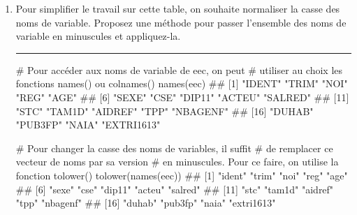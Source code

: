 \documentclass[12pt,twosided, notitlepage]{book}
\newenvironment{Shaded}{}{}
\newcommand{\KeywordTok}[1]{\textcolor[rgb]{0.00,0.00,1.00}{#1}}
\newcommand{\CommentTok}[1]{\textcolor[rgb]{0.00,0.50,0.00}{#1}}
\newcommand{\NormalTok}[1]{#1}
\newif \ifsol
\renewenvironment{Shaded}{\begin{snugshade}}{\end{snugshade}}
\begin{document}
\begin{enumerate}
  \begin{center} \rule{0.5\linewidth}{\linethickness}\end{center}

  \bigskip  \fi 
\item
  Pour simplifier le travail sur cette table, on souhaite normaliser la
  casse des noms de variable. Proposez une méthode pour passer
  l'ensemble des noms de variable en minuscules et
  appliquez-la.

  \ifsol  \textbf{Indication} Pensez à utiliser les fonctions
  \texttt{names()} et \texttt{tolower()}.\fi 

  \ifsol 

  \begin{center} \rule{0.5\linewidth}{\linethickness}\end{center}

\begin{Shaded}
\begin{Highlighting}[]
\CommentTok{# Pour accéder aux noms de variable de eec, on peut}
\CommentTok{# utiliser au choix les fonctions names() ou colnames()}
\KeywordTok{names}\NormalTok{(eec)}
\NormalTok{  ##  [1] "IDENT"     "TRIM"      "NOI"       "REG"       "AGE"      }
\NormalTok{  ##  [6] "SEXE"      "CSE"       "DIP11"     "ACTEU"     "SALRED"   }
\NormalTok{  ## [11] "STC"       "TAM1D"     "AIDREF"    "TPP"       "NBAGENF"  }
\NormalTok{  ## [16] "DUHAB"     "PUB3FP"    "NAIA"      "EXTRI1613"}

\CommentTok{# Pour changer la casse des noms de variables, il suffit}
\CommentTok{# de remplacer ce vecteur de noms par sa version }
\CommentTok{# en minuscules. Pour ce faire, on utilise la fonction tolower()}
\KeywordTok{tolower}\NormalTok{(}\KeywordTok{names}\NormalTok{(eec))}
\NormalTok{  ##  [1] "ident"     "trim"      "noi"       "reg"       "age"      }
\NormalTok{  ##  [6] "sexe"      "cse"       "dip11"     "acteu"     "salred"   }
\NormalTok{  ## [11] "stc"       "tam1d"     "aidref"    "tpp"       "nbagenf"  }
\NormalTok{  ## [16] "duhab"     "pub3fp"    "naia"      "extri1613"}


\end{Highlighting}
\end{Shaded}
\end{enumerate}
\end{document}

